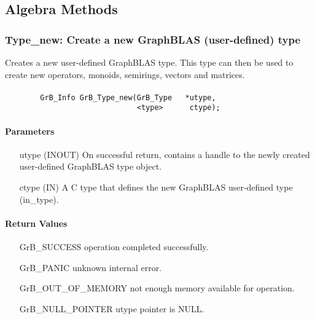 \subsection{Algebra Methods}
\label{Sec:AlgebraMethods}


\subsubsection{{\sf Type\_new}: Create a new GraphBLAS (user-defined) type}
\label{Sec:TypeNew}

Creates a new user-defined GraphBLAS type. This type can then be used to create new
operators, monoids, semirings, vectors and matrices.

\paragraph{\syntax}

\begin{verbatim}
        GrB_Info GrB_Type_new(GrB_Type	 *utype,
                              <type>	  ctype);
\end{verbatim}

\paragraph{Parameters}

\begin{itemize}[leftmargin=1.1in]
    \item[{\sf utype}] ({\sf INOUT}) On successful return, contains a handle 
                                     to the newly created user-defined GraphBLAS 
                                     type object.
	\item[{\sf ctype}] ({\sf IN})    A C type that defines the new GraphBLAS 
                                     user-defined type ({\sf in\_type}).
\end{itemize}

\paragraph{Return Values}

\begin{itemize}[leftmargin=2.1in]
\item[{\sf GrB\_SUCCESS}]           operation completed successfully.
\item[{\sf GrB\_PANIC}]             unknown internal error.
\item[{\sf GrB\_OUT\_OF\_MEMORY}]          not enough memory available for operation.
\item[{\sf GrB\_NULL\_POINTER}]    {\sf utype} pointer is {\sf NULL}.
\end{itemize}

